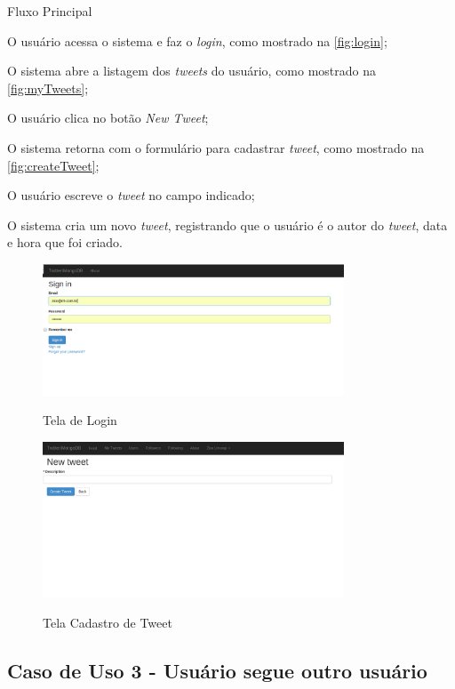 Fluxo Principal
\begin{enumerate}
{\setlength\itemindent{25pt}
\item O usuário acessa o sistema e faz o \textit{login}, como mostrado na \autoref{fig:login};
\item O sistema abre a listagem dos \textit{tweets} do usuário, como mostrado na \autoref{fig:myTweets};
\item O usuário clica no botão \textit{New Tweet};
\item O sistema retorna com o formulário para cadastrar \textit{tweet}, como mostrado na \autoref{fig:createTweet};
\item O usuário escreve o \textit{tweet} no campo indicado;
\item O sistema cria um novo \textit{tweet}, registrando que o usuário é o autor do \textit{tweet}, data e hora que foi criado.
}
\end{enumerate}
\begin{figure}[H]
    \centering
    \caption{Tela de Login}
    \includegraphics[width=0.8\textwidth]{./04-figuras/login.png}
    \label{fig:login}
\end{figure}
\begin{figure}[H]
    \centering
    \caption{Tela Cadastro de Tweet}
    \includegraphics[width=0.8\textwidth]{./04-figuras/createTweet.png}
    \label{fig:createTweet}
\end{figure}


\subsection{Caso de Uso 3 - Usuário segue outro usuário}
\label{subsec:useCaseUserFollow}

